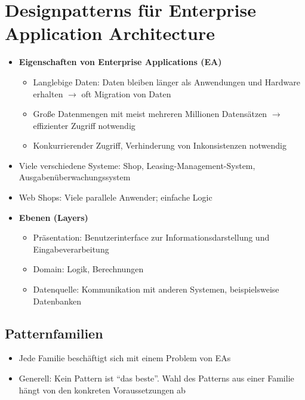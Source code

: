 \section{Designpatterns für Enterprise Application Architecture}
\begin{itemize}
	\item \textbf{Eigenschaften von Enterprise Applications (EA)}
	\begin{itemize}
		\item Langlebige Daten: Daten bleiben länger als Anwendungen und Hardware erhalten \(\rightarrow\) oft Migration von Daten
		\item Große Datenmengen mit meist mehreren Millionen Datensätzen \(\rightarrow\) effizienter Zugriff notwendig
		\item Konkurrierender Zugriff, Verhinderung von Inkonsistenzen notwendig
	\end{itemize}
	\item Viele verschiedene Systeme: Shop, Leasing-Management-System, Ausgabenüberwachungssystem
	\item Web Shops: Viele parallele Anwender; einfache Logic
	\item \textbf{Ebenen (Layers)}
	\begin{itemize}
		\item Präsentation: Benutzerinterface zur Informationsdarstellung und Eingabeverarbeitung
		\item Domain: Logik, Berechnungen
		\item Datenquelle: Kommunikation mit anderen Systemen, beispielsweise Datenbanken
	\end{itemize}
\end{itemize}


\subsection{Patternfamilien}
\begin{itemize}
	\item Jede Familie beschäftigt sich mit einem Problem von EAs
	\item Generell: Kein Pattern ist "`das beste"'. Wahl des Patterns aus einer Familie hängt von den konkreten Voraussetzungen ab
\end{itemize}

